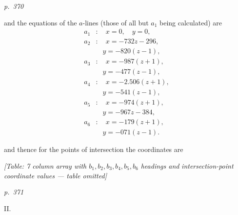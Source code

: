 \documentclass[11pt,a4paper]{book}
\begin{document}
\bigskip
\textit{p.~370}
\smallskip

\noindent
and the equations of the $a$-lines (those of all but $a_1$ being calculated) are
\begin{align*}
a_1 &: \quad x = 0, \quad y = 0, \\
a_2 &: \quad x = -732 z - 296, \\
&\quad y = -820(z - 1), \\
a_3 &: \quad x = -987(z + 1), \\
&\quad y = -477(z - 1), \\
a_4 &: \quad x = -2.506(z + 1), \\
&\quad y = -541(z - 1), \\
a_5 &: \quad x = -974(z + 1), \\
&\quad y = -967 z - 384, \\
a_6 &: \quad x = -179(z + 1), \\
&\quad y = -071(z - 1).
\end{align*}

and thence for the points of intersection the coordinates are

\begin{center}
\textit{[Table: 7 column array with $b_1, b_2, b_3, b_4, b_5, b_6$ headings and}
\textit{intersection-point coordinate values --- table omitted]}
\end{center}

\clearpage

\bigskip
\textit{p.~371}
\smallskip

\noindent
\textsc{II.}
\end{document}
